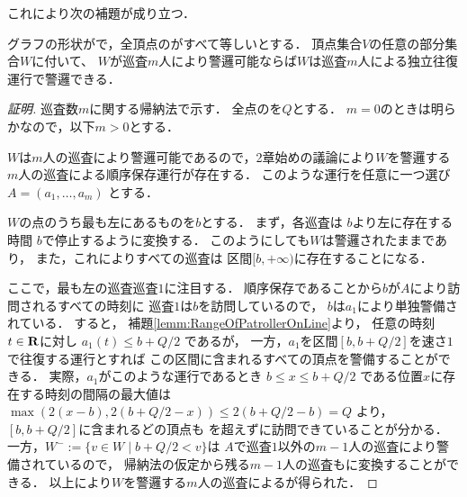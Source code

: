 これにより次の補題が成り立つ．


\begin{lemm}
\label{lemm:LineEqualTimelimitIndependentInterval}
グラフの形状が{\graphLine}で，全頂点の{\idletime}がすべて等しいとする．
頂点集合$V$の任意の部分集合$W$に付いて、
$W$が巡査$m$人により警邏可能ならば$W$は巡査$m$人による独立往復運行で警邏できる．
\end{lemm}
\begin{proof}[証明]
\newcommand{\leftmostpoint}{b}  %
\newcommand{\newpatroller}{l}
\newcommand{\leftmostpatroller}{巡査1}
\newcommand{\leftmostpatOpr}{a_1}

巡査数$m$に関する帰納法で示す．
全点の{\idletime}を$Q$とする．
$m = 0$のときは明らかなので，以下$m > 0$とする．

$W$は$m$人の巡査により警邏可能であるので，2章始めの議論により$W$を警邏する$m$人の巡査による順序保存運行が存在する．
このような運行を任意に一つ選び
$A = (a _1, \ldots, a _m)$
とする．

$W$の点のうち最も左にあるものを$\leftmostpoint$とする．
まず，各巡査は
$\leftmostpoint$より左に存在する時間
$\leftmostpoint$で停止するように変換する．
このようにしても$W$は警邏されたままであり，
また，これによりすべての巡査は
区間$[\leftmostpoint, +\infty)$に存在することになる．

ここで，最も左の巡査$\leftmostpatroller$に注目する．
順序保存であることから$\leftmostpoint$が$A$により訪問されるすべての時刻に
$\leftmostpatroller$は$\leftmostpoint$を訪問しているので，
$\leftmostpoint$は$\leftmostpatOpr$により単独警備されている．
%
すると，
補題\ref{lemm:RangeOfPatrollerOnLine}より，
任意の時刻$t \in \mathbf R$に対し
$\leftmostpatOpr(t) \leq \leftmostpoint + Q/2$
であるが，
%
一方，$\leftmostpatOpr$を区間$[b, b + Q/2]$を速さ$1$で往復する運行とすれば
この区間に含まれるすべての頂点を警備することができる．
実際，$\leftmostpatOpr$がこのような運行であるとき
$\leftmostpoint \leq x \leq \leftmostpoint + Q/2$
である位置$x$に存在する時刻の間隔の最大値は
$ \max( 2(x - \leftmostpoint), 2(\leftmostpoint + Q/2 - x) )
  \leq 2(\leftmostpoint + Q/2 - \leftmostpoint) = Q $
より，$[\leftmostpoint, \leftmostpoint + Q/2]$に含まれるどの頂点も
{\idletime}を超えずに訪問できていることが分かる．
%
一方，$W^- := \{ v \in W \mid \leftmostpoint + Q/2 < v \}$は
$A$で$\leftmostpatroller$以外の$m - 1$人の巡査により警備されているので，
帰納法の仮定から残る$m - 1$人の巡査も{\indSectOperation}に変換することができる．
以上により$W$を警邏する$m$人の巡査による{\indSectOperation}が得られた．
\end{proof}


